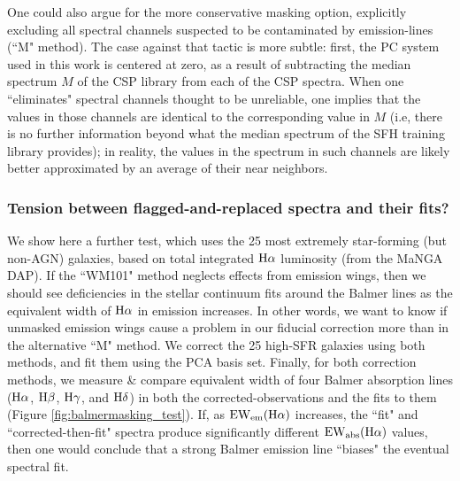 One could also argue for the more conservative masking option, explicitly excluding all spectral channels suspected to be contaminated by emission-lines (``M" method). The case against that tactic is more subtle: first, the PC system used in this work is centered at zero, as a result of subtracting the median spectrum $M$ of the CSP library from each of the CSP spectra. When one ``eliminates" spectral channels thought to be unreliable, one implies that the values in those channels are identical to the corresponding value in $M$ (i.e, there is no further information beyond what the median spectrum of the SFH training library provides); in reality, the values in the spectrum in such channels are likely better approximated by an average of their near neighbors.

\subsubsection{Tension between flagged-and-replaced spectra and their fits?}

We show here a further test, which uses the 25 most extremely star-forming (but non-AGN) galaxies, based on total integrated ${\rm H\alpha}$ luminosity (from the MaNGA DAP). If the ``WM101" method neglects effects from emission wings, then we should see deficiencies in the stellar continuum fits around the Balmer lines as the equivalent width of ${\rm H\alpha}$ in emission increases. In other words, we want to know if unmasked emission wings cause a problem in our fiducial correction more than in the alternative ``M" method. We correct the 25 high-SFR galaxies using both methods, and fit them using the PCA basis set. Finally, for both correction methods, we measure \& compare equivalent width of four Balmer absorption lines (${\rm H\alpha}$, ${\rm H\beta}$, ${\rm H\gamma}$, and ${\rm H\delta}$) in both the corrected-observations and the fits to them (Figure \ref{fig:balmermasking_test}). If, as ${\rm EW_{em}(H\alpha)}$ increases, the ``fit" and ``corrected-then-fit" spectra produce significantly different ${\rm EW_{abs}(H\alpha)}$ values, then one would conclude that a strong Balmer emission line ``biases" the eventual spectral fit.

